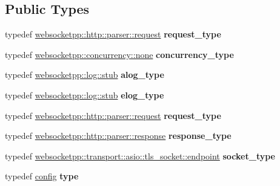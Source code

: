 \subsection*{Public Types}
\begin{DoxyCompactItemize}
\item 
\mbox{\label{classconfig_a47084e20c1e8e92efda01afebcf40fb1}} 
typedef \mbox{\hyperlink{classwebsocketpp_1_1http_1_1parser_1_1request}{websocketpp\+::http\+::parser\+::request}} {\bfseries request\+\_\+type}
\item 
\mbox{\label{classconfig_a33b44b41c443ce5557d8ba0dc9f9586d}} 
typedef \mbox{\hyperlink{classwebsocketpp_1_1concurrency_1_1none}{websocketpp\+::concurrency\+::none}} {\bfseries concurrency\+\_\+type}
\item 
\mbox{\label{classconfig_a2fbf18cfbc2acb193641dd978b7c5a8b}} 
typedef \mbox{\hyperlink{classwebsocketpp_1_1log_1_1stub}{websocketpp\+::log\+::stub}} {\bfseries alog\+\_\+type}
\item 
\mbox{\label{classconfig_ad075aec76360e88692914488f384f27c}} 
typedef \mbox{\hyperlink{classwebsocketpp_1_1log_1_1stub}{websocketpp\+::log\+::stub}} {\bfseries elog\+\_\+type}
\item 
\mbox{\label{classconfig_a47084e20c1e8e92efda01afebcf40fb1}} 
typedef \mbox{\hyperlink{classwebsocketpp_1_1http_1_1parser_1_1request}{websocketpp\+::http\+::parser\+::request}} {\bfseries request\+\_\+type}
\item 
\mbox{\label{classconfig_a4896c7ce43482f4ec0347911fd414a56}} 
typedef \mbox{\hyperlink{classwebsocketpp_1_1http_1_1parser_1_1response}{websocketpp\+::http\+::parser\+::response}} {\bfseries response\+\_\+type}
\item 
\mbox{\label{classconfig_aeacabf00ba9ded7364aa0508f91a3b20}} 
typedef \mbox{\hyperlink{classwebsocketpp_1_1transport_1_1asio_1_1tls__socket_1_1endpoint}{websocketpp\+::transport\+::asio\+::tls\+\_\+socket\+::endpoint}} {\bfseries socket\+\_\+type}
\item 
\mbox{\label{classconfig_ad4ebcddd1ad3164f8a4a31dbda329faa}} 
typedef \mbox{\hyperlink{classconfig}{config}} {\bfseries type}

\end{DoxyCompactItemize}
